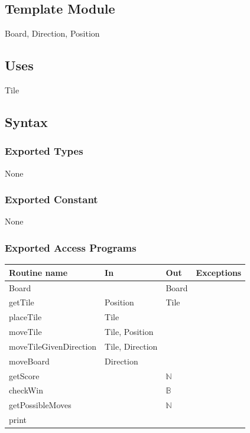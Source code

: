 \documentclass[12pt]{article}
\begin{document}
\subsection*{Template Module}

Board, Direction, Position

\subsection* {Uses}

Tile

\subsection* {Syntax}

\subsubsection* {Exported Types}

None

\subsubsection* {Exported Constant}

None

\subsubsection* {Exported Access Programs}

\begin{tabular}{| l | l | l | l |}
\hline
\textbf{Routine name} & \textbf{In} & \textbf{Out} & \textbf{Exceptions}\\
\hline
Board & ~ & Board & \\
\hline
getTile & Position & Tile & \\
\hline
placeTile & Tile & ~ & \\
\hline
moveTile & Tile, Position & ~ & ~\\
\hline
moveTileGivenDirection & Tile, Direction & ~ & \\
\hline
moveBoard  &  Direction  &  ~     & \\
\hline
getScore & ~ & $\mathbb{N}$ & ~\\
\hline
checkWin & ~ & $\mathbb{B}$ & ~\\
\hline
getPossibleMoves & ~ & $\mathbb{N}$ & ~\\
\hline
print & ~ & ~ & ~ \\
\hline
\end{tabular}
\end{document}
